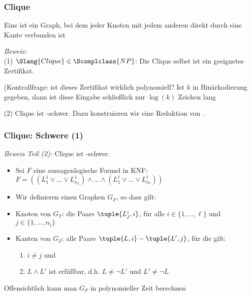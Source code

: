 \documentclass[aspectratio=1610,onlymath]{beamer}
\begin{document}
\begin{frame}\frametitle{Clique}

Eine  ist ein Graph, bei dem jeder Knoten mit jedem anderen
direkt durch eine Kante verbunden ist\medskip

\medskip\pause

\pause

\emph{Beweis:}\\
(1) $\Slang{Clique}\in\Scomplclass{NP}$: Die Clique selbst ist ein geeignetes Zertifikat.\\[1ex] {\tiny(Kontrollfrage: ist dieses Zertifikat wirklich polynomiell? Ist $k$ in Binärkodierung gegeben, dann ist diese Eingabe schließlich nur $\log(k)$ Zeichen lang \ghost{\ldots)}\pause

}\medskip

(2) Clique ist -schwer. Dazu konstruieren wir eine Reduktion von .

\end{frame}

\begin{frame}\frametitle{Clique: Schwere (1)}

\emph{Beweis Teil (2):} Clique ist -schwer.
\begin{itemize}
\item Sei $F$ eine aussagenlogische Formel in KNF:\\
$F=\left((L^1_1\vee \ldots\vee L^1_{n_1})\wedge \ldots\wedge (L^\ell_1\vee \ldots\vee L^\ell_{n_\ell})\right)$\pause
%
\item Wir definieren einen Graphen $G_F$, so dass gilt:\\[1ex]
\pause
%
\item \alert{Knoten von $G_F$:} die Paare $\tuple{L^i_j,i}$, für alle $i\in\{1,\ldots,\ell\}$ und $j\in\{1,\ldots,n_i\}$\pause
%
\item \alert{Kanten von $G_F$:} alle Paare $\tuple{L,i}-\tuple{L',j}$, für die gilt:
\begin{enumerate}[(1)]
\item $i\neq j$ und
\item $L\wedge L'$ ist erfüllbar, d.h. $L\neq \neg L'$ und $L'\neq \neg L$
\end{enumerate}
\end{itemize}
Offensichtlich kann man $G_F$ in polynomieller Zeit berechnen

\end{frame}
\end{document}
